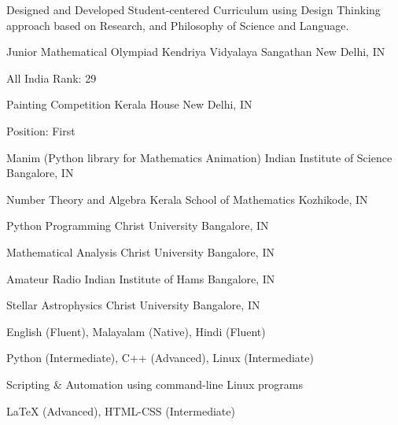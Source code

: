 Designed and Developed Student-centered Curriculum using Design Thinking approach based on Research, and Philosophy of Science and Language.


{Junior Mathematical Olympiad}
{Kendriya Vidyalaya Sangathan}
{New Delhi, IN}

All India Rank: 29

{Painting Competition}
{Kerala House}
{New Delhi, IN}

Position: First

{Manim (Python library for Mathematics Animation)}
{Indian Institute of Science}
{Bangalore, IN}

{Number Theory and Algebra}
{Kerala School of Mathematics}
{Kozhikode, IN}

{Python Programming}
{Christ University}
{Bangalore, IN}

{Mathematical Analysis}
{Christ University}
{Bangalore, IN}

{Amateur Radio}
{Indian Institute of Hams}
{Bangalore, IN}

{Stellar Astrophysics}
{Christ University}
{Bangalore, IN}

\bigskip

{English (Fluent), Malayalam (Native), Hindi (Fluent)}

{Python (Intermediate), C++ (Advanced), Linux (Intermediate)}

Scripting \& Automation using command-line Linux programs

{LaTeX (Advanced), HTML-CSS (Intermediate)}



